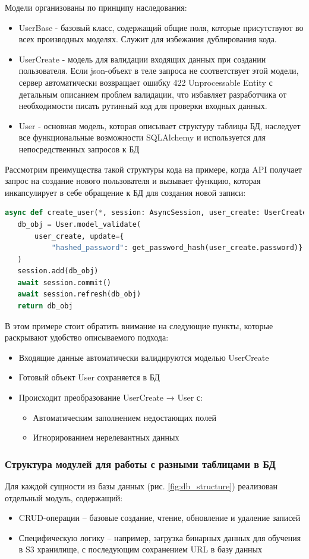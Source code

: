 Модели организованы по принципу наследования:
\begin{itemize}
    \item UserBase - базовый класс, содержащий общие поля, которые присутствуют во всех производных моделях. Служит для избежания дублирования кода.
    \item UserCreate - модель для валидации входящих данных при создании пользователя. Если json-объект в теле запроса не соответствует этой модели, сервер автоматически возвращает ошибку 422 Unprocessable Entity с детальным описанием проблем валидации, что избавляет разработчика от необходимости писать рутинный код для проверки входных данных.
    \item User - основная модель, которая описывает структуру таблицы БД, наследует все функциональные возможности SQLAlchemy и используется для непосредственных запросов к БД
\end{itemize}

Рассмотрим преимущества такой структуры кода на примере, когда API получает запрос на создание нового пользователя и вызывает функцию, которая инкапсулирует в себе обращение к БД для создания новой записи:
\begin{lstlisting}[language=Python, numbers=none, frame=none]
async def create_user(*, session: AsyncSession, user_create: UserCreate) -> User:
   db_obj = User.model_validate(
       user_create, update={
           "hashed_password": get_password_hash(user_create.password)}
   )
   session.add(db_obj)
   await session.commit()
   await session.refresh(db_obj)
   return db_obj
\end{lstlisting}
В этом примере стоит обратить внимание на следующие пункты, которые раскрывают удобство описываемого подхода:
\begin{itemize}
    \item Входящие данные автоматически валидируются моделью UserCreate
    \item Готовый объект User сохраняется в БД
    \item Происходит преобразование UserCreate → User с:
    \begin{itemize}
        \item Автоматическим заполнением недостающих полей
        \item Игнорированием нерелевантных данных
    \end{itemize}
\end{itemize}

\subsubsection{Структура модулей для работы с разными таблицами в БД}
Для каждой сущности из базы данных (рис. \ref{fig:db_structure}) реализован отдельный модуль, содержащий:
\begin{itemize}
    \item CRUD-операции – базовые создание, чтение, обновление и удаление записей
    \item Специфическую логику – например, загрузка бинарных данных для обучения в S3 хранилище, с последующим сохранением URL в базу данных
\end{itemize}

